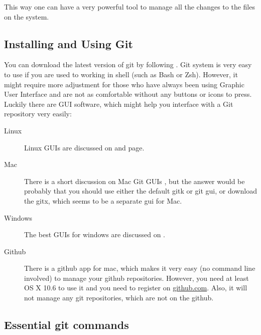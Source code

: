 \documentclass[
]{scrartcl}
\begin{document}
%
This way one can have a very powerful tool to manage all the changes to the
    files on the system.

%
\subsection{Installing and Using Git}

%
You can download the latest version of git by following
    .
%
Git system is very easy to use if you are used to working in shell (such as Bash
    or Zsh).
%
However, it might require more adjustment for those who have always been using
    Graphic User Interface and are not as comfortable without any buttons or
    icons to press.
%
Luckily there are GUI software, which might help you interface with a Git
    repository very easily:
%
\begin{description}
    \item[Linux]
        Linux GUIs are discussed on
            and
            page.
    \item[Mac] 
        There is a short discussion on Mac Git GUIs
            ,
            but the answer would be probably that you should use either the
            default gitk or git gui, or download the gitx, which seems to be a
            separate gui for Mac.
    \item[Windows] 
        The best GUIs for windows are discussed on
            .
    \item[Github] 
        There is a github app for mac, which makes it very easy (no command line
            involved) to manage your github repositories. 
        However, you need at least OS X 10.6 to use it and you need to register
            on \href{https://github.com}{github.com}.
        Also, it will not manage any git repositories, which are not on the
            github.
\end{description}

%
\subsection{Essential git commands}
\end{document}
